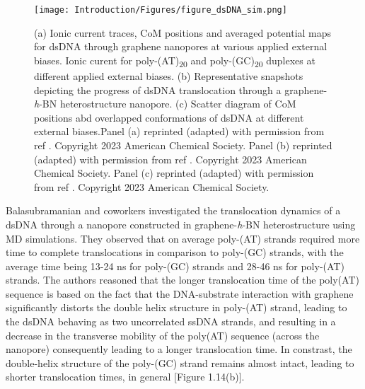 \begin{figure}
    \centering
    \texttt{[image: Introduction/Figures/figure\_dsDNA\_sim.png]}
    \caption[Results from dsDNA - graphene nanopore all-atom MD simulations]{(a) Ionic current traces, CoM positions and averaged potential maps for dsDNA through graphene nanopores at various applied external biases. Ionic curent for poly-(AT)\textsubscript{20} and poly-(GC)\textsubscript{20} duplexes at different applied external biases. (b) Representative snapshots depicting the progress of dsDNA translocation through a graphene-\textit{h}-BN heterostructure nanopore. (c) Scatter diagram of CoM positions abd overlapped conformations of dsDNA at different external biases.Panel (a) reprinted (adapted) with permission from ref \supercite{sathe_computational_2011}. Copyright 2023 American Chemical Society. Panel (b) reprinted (adapted) with permission from ref \supercite{balasubramanian_dna_2021}. Copyright 2023 American Chemical Society. Panel (c) reprinted (adapted) with permission from ref \supercite{qiu_electrically_2016}. Copyright 2023 American Chemical Society.}
    \label{fig:figure14}
\end{figure}

Balasubramanian and coworkers investigated the translocation dynamics of a dsDNA through a nanopore constructed in graphene-\textit{h}-BN heterostructure using MD simulations\supercite{balasubramanian_dna_2021}. They observed that on average poly-(AT) strands required more time to complete translocations in comparison to poly-(GC) strands, with the average time being 13-24 ns for poly-(GC) strands and 28-46 ns for poly-(AT) strands. The authors reasoned that the longer translocation time of the poly(AT) sequence is based on the fact that the DNA-substrate interaction with graphene significantly distorts the double helix structure in poly-(AT) strand, leading to the dsDNA behaving as two uncorrelated ssDNA strands, and resulting in a decrease in the transverse mobility of the poly(AT) sequence (across the nanopore) consequently leading to a longer translocation time. In constrast, the double-helix structure of the poly-(GC) strand remains almost intact, leading to shorter translocation times, in general [Figure 1.14(b)].

